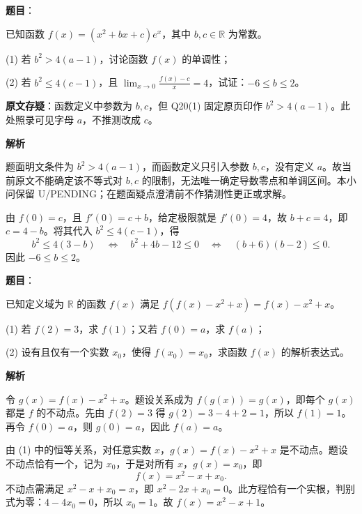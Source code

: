 \begin{answer}

\textbf{题目}：

已知函数 \(f(x)=(x^2+bx+c)e^x\)，其中 \(b,c\in\mathbb R\) 为常数。

(1) 若 \(b^2>4(a-1)\)，讨论函数 \(f(x)\) 的单调性；

(2) 若 \(b^2\leq4(c-1)\)，且 \(\displaystyle\lim_{x\to0}\frac{f(x)-c}{x}=4\)，试证：\(-6\leq b\leq2\)。

\begin{gktip}
\textbf{原文存疑}：函数定义中参数为 $b,c$，但 Q20(1) 固定原页印作 $b^2>4(a-1)$。此处照录可见字母 $a$，不推测改成 $c$。
\end{gktip}

\textbf{解析}


题面明文条件为 \(b^2>4(a-1)\)，而函数定义只引入参数 \(b,c\)，没有定义 \(a\)。故当前原文不能确定该不等式对 \(b,c\) 的限制，无法唯一确定导数零点和单调区间。本小问保留 U/PENDING；在题面疑点澄清前不作猜测性更正或求解。


由 \(f(0)=c\)，且 \(f'(0)=c+b\)，给定极限就是 \(f'(0)=4\)，故 \(b+c=4\)，即 \(c=4-b\)。将其代入 \(b^2\le4(c-1)\)，得
\nopagebreak[4]
\[
b^2\le4(3-b)\quad\Longleftrightarrow\quad b^2+4b-12\le0
\quad\Longleftrightarrow\quad(b+6)(b-2)\le0.
\]
因此 \(-6\le b\le2\)。



\end{answer}
\begin{answer}

\textbf{题目}：

已知定义域为 \(\mathbb R\) 的函数 \(f(x)\) 满足 \(f(f(x)-x^2+x)=f(x)-x^2+x\)。

(1) 若 \(f(2)=3\)，求 \(f(1)\)；又若 \(f(0)=a\)，求 \(f(a)\)；

(2) 设有且仅有一个实数 \(x_0\)，使得 \(f(x_0)=x_0\)，求函数 \(f(x)\) 的解析表达式。

\textbf{解析}


令 \(g(x)=f(x)-x^2+x\)。题设关系成为 \(f(g(x))=g(x)\)，即每个 \(g(x)\) 都是 \(f\) 的不动点。先由 \(f(2)=3\) 得 \(g(2)=3-4+2=1\)，所以 \(f(1)=1\)。再令 \(f(0)=a\)，则 \(g(0)=a\)，因此 \(f(a)=a\)。


由 (1) 中的恒等关系，对任意实数 \(x\)，\(g(x)=f(x)-x^2+x\) 是不动点。题设不动点恰有一个，记为 \(x_0\)，于是对所有 \(x\)，\(g(x)=x_0\)，即
\nopagebreak[4]
\[
f(x)=x^2-x+x_0.
\]
不动点需满足 \(x^2-x+x_0=x\)，即 \(x^2-2x+x_0=0\)。此方程恰有一个实根，判别式为零：\(4-4x_0=0\)，所以 \(x_0=1\)。故 \(f(x)=x^2-x+1\)。



\end{answer}

